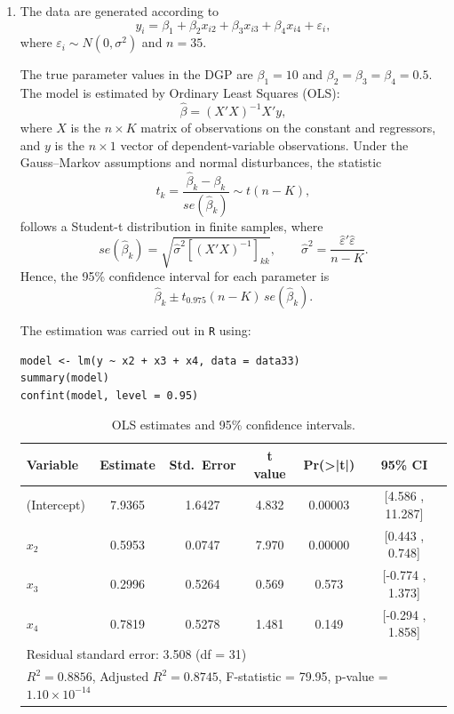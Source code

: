 \begin{enumerate}[label=(\roman*)]
    \item 

The data are generated according to
\[
y_i = \beta_1 + \beta_2 x_{i2} + \beta_3 x_{i3} + \beta_4 x_{i4} + \varepsilon_i,
\]
where $\varepsilon_i \sim N(0,\sigma^2)$ and $n = 35$.  

The true parameter values in the DGP are $\beta_1 = 10$ and $\beta_2 = \beta_3 = \beta_4 = 0.5$. The model is estimated by Ordinary Least Squares (OLS):
\[
\hat{\beta} = (X'X)^{-1} X'y,
\]
where $X$ is the $n \times K$ matrix of observations on the constant and regressors, and $y$ is the $n \times 1$ vector of dependent-variable observations. Under the Gauss–Markov assumptions and normal disturbances, the statistic
\[
t_k = \frac{\hat{\beta}_k - \beta_k}{se(\hat{\beta}_k)} \sim t(n-K),
\]
follows a Student-t distribution in finite samples, where
\[
se(\hat{\beta}_k) = \sqrt{\hat{\sigma}^2[(X'X)^{-1}]_{kk}}, \qquad
\hat{\sigma}^2 = \frac{\hat{\varepsilon}'\hat{\varepsilon}}{n-K}.
\]
Hence, the 95\% confidence interval for each parameter is
\[
\hat{\beta}_k \pm t_{0.975}(n-K)\,se(\hat{\beta}_k).
\]

\noindent The estimation was carried out in \texttt{R} using:
\begin{verbatim}
model <- lm(y ~ x2 + x3 + x4, data = data33)
summary(model)
confint(model, level = 0.95)
\end{verbatim}

\begin{table}[H]
\centering
\caption{OLS estimates and 95\% confidence intervals.}
\begin{tabular}{lccccc}
\hline
Variable & Estimate & Std.\ Error & t value & Pr(>|t|) & 95\% CI \\ 
\hline
(Intercept) & 7.9365 & 1.6427 & 4.832 & 0.00003 & [4.586 , 11.287] \\
$x_{2}$ & 0.5953 & 0.0747 & 7.970 & 0.00000 & [0.443 , 0.748] \\
$x_{3}$ & 0.2996 & 0.5264 & 0.569 & 0.573 & [-0.774 , 1.373] \\
$x_{4}$ & 0.7819 & 0.5278 & 1.481 & 0.149 & [-0.294 , 1.858] \\
\hline
\multicolumn{6}{l}{\footnotesize Residual standard error: 3.508 (df = 31)}\\
\multicolumn{6}{l}{\footnotesize $R^2 = 0.8856$, Adjusted $R^2 = 0.8745$, F-statistic = 79.95, p-value = $1.10\times10^{-14}$}\\
\end{tabular}
\end{table}


\end{enumerate}
